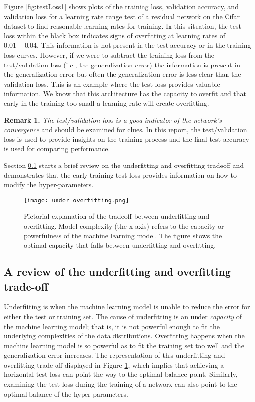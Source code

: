 \documentclass{article} %
\begin{document}
Figure \ref{fig:testLoss1} shows plots of the training loss, validation accuracy, and validation loss for a learning rate range test of a residual network on the Cifar dataset to find reasonable learning rates for training.  In this situation, the test loss within the black box indicates signs of overfitting at learning rates of $0.01 - 0.04$.  This information is not present in the test accuracy or in the training loss curves.  However, if we were to subtract the training loss from the test/validation loss (i.e., the generalization error) the information is present in the generalization error but often the generalization error is less clear than the validation loss. This is an example where the test loss provides valuable information.  We know that this architecture has the capacity to overfit and that early in the training too small a learning rate will create  overfitting.  

\textbf{Remark 1.} \emph{The test/validation loss is a good indicator of the network's convergence} and should be examined for clues.
In this report, the test/validation loss is used to provide insights on the training process and the final test accuracy is used for comparing performance.

Section \ref{sec:fitting} starts a brief review on the underfitting and overfitting tradeoff and demonstrates that the early training test loss provides information on how to modify the hyper-parameters.

\begin{figure}[htb]
	\center
	\texttt{[image: under-overfitting.png]}
	\caption{Pictorial explanation of the tradeoff between underfitting and overfitting.  Model complexity (the x axis) refers to the capacity or powerfulness of the machine learning model.  The figure shows the optimal capacity that falls between underfitting and overfitting.}
	\label{fig:bias-variance}       %
\end{figure}


\subsection{A review of the underfitting and overfitting trade-off}
\label{sec:fitting}

Underfitting is when the machine learning model is unable to reduce the error for either the test or training set.  The cause of underfitting is an under \emph{capacity} of the machine learning model; that is, it is not powerful enough to fit the underlying complexities of the data distributions.  Overfitting happens when the machine learning model is so powerful as to fit the training set too well and the generalization error increases.  The representation of this underfitting and overfitting trade-off displayed in Figure \ref{fig:bias-variance}, which implies that achieving a horizontal test loss can point the way to the optimal balance point.  Similarly, examining the test loss during the training of a network can also point to the optimal balance of the hyper-parameters.  
\end{document}
